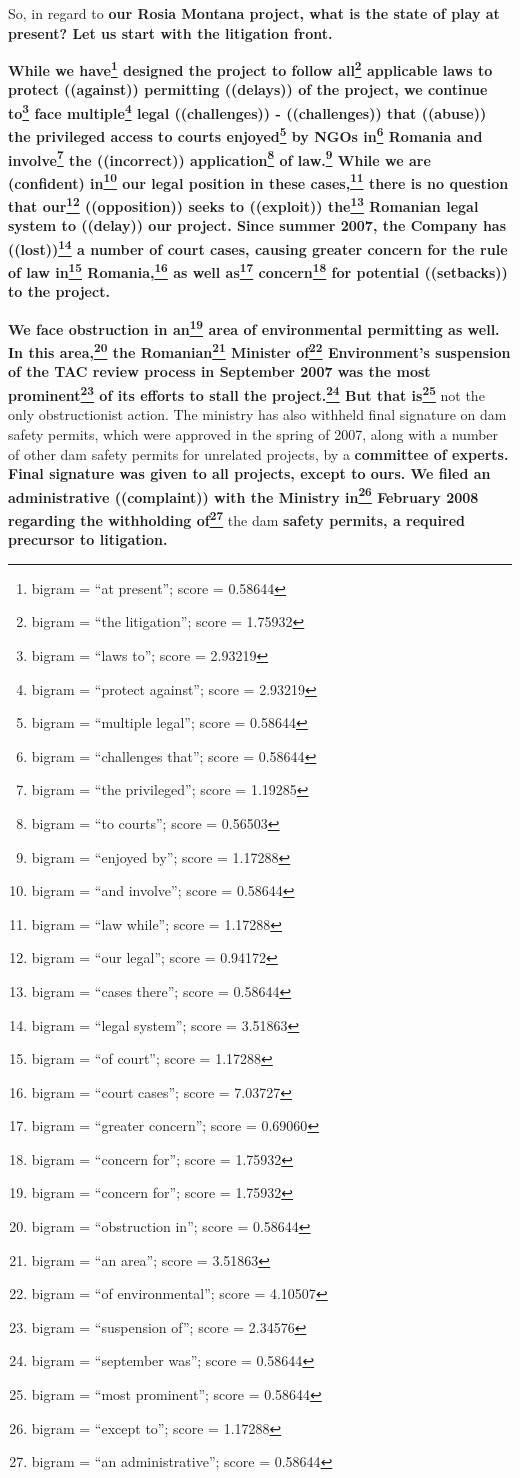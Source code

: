 \documentclass{article}
\begin{document}
 So, in regard to \textbf{our Rosia Montana project, what is the state of play at present? Let us start with the litigation front.} 

 \textbf{While we have\footnote{bigram = ``at present''; score = 0.58644} designed the project to follow all\footnote{bigram = ``the litigation''; score = 1.75932} applicable laws to protect ((against)) permitting ((delays)) of the project, we continue to\footnote{bigram = ``laws to''; score = 2.93219} face multiple\footnote{bigram = ``protect against''; score = 2.93219} legal ((challenges)) - ((challenges)) that ((abuse)) the privileged access to courts enjoyed\footnote{bigram = ``multiple legal''; score = 0.58644} by NGOs in\footnote{bigram = ``challenges that''; score = 0.58644} Romania and involve\footnote{bigram = ``the privileged''; score = 1.19285} the ((incorrect)) application\footnote{bigram = ``to courts''; score = 0.56503} of law.\footnote{bigram = ``enjoyed by''; score = 1.17288} While we are (confident) in\footnote{bigram = ``and involve''; score = 0.58644} our legal position in these cases,\footnote{bigram = ``law while''; score = 1.17288} there is no question that our\footnote{bigram = ``our legal''; score = 0.94172} ((opposition)) seeks to ((exploit)) the\footnote{bigram = ``cases there''; score = 0.58644} Romanian legal system to ((delay)) our project. Since summer 2007, the Company has ((lost))\footnote{bigram = ``legal system''; score = 3.51863} a number of court cases, causing greater concern for the rule of law in\footnote{bigram = ``of court''; score = 1.17288} Romania,\footnote{bigram = ``court cases''; score = 7.03727} as well as\footnote{bigram = ``greater concern''; score = 0.69060} concern\footnote{bigram = ``concern for''; score = 1.75932} for potential ((setbacks)) to the project.} 

 \textbf{We face obstruction in an\footnote{bigram = ``concern for''; score = 1.75932} area of environmental permitting as well. In this area,\footnote{bigram = ``obstruction in''; score = 0.58644} the Romanian\footnote{bigram = ``an area''; score = 3.51863} Minister of\footnote{bigram = ``of environmental''; score = 4.10507} Environment's suspension of the TAC review process in September 2007 was the most prominent\footnote{bigram = ``suspension of''; score = 2.34576} of its efforts to stall the project.\footnote{bigram = ``september was''; score = 0.58644} But that is\footnote{bigram = ``most prominent''; score = 0.58644}} not the only obstructionist action. The ministry has also withheld final signature on dam safety permits, which were approved in the spring of 2007, along with a number of other dam safety permits for unrelated projects, by a \textbf{committee of experts. Final signature was given to all projects, except to ours. We filed an administrative ((complaint)) with the Ministry in\footnote{bigram = ``except to''; score = 1.17288} February 2008 regarding the withholding of\footnote{bigram = ``an administrative''; score = 0.58644}} the dam \textbf{safety permits, a required precursor to litigation.} 
\end{document}
